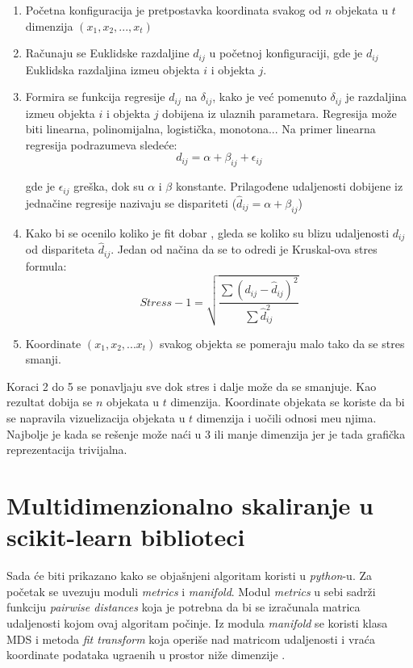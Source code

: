 \begin{enumerate}
    \item Po\v cetna konfiguracija je pretpostavka koordinata svakog od $n$ objekata u $t$ dimenzija $(x_{1}, x_{2}, ..., x_{t})$
    \item Ra\v cunaju se Euklidske razdaljine $d_{ij}$ u po\v cetnoj konfiguraciji, gde je $d_{ij}$ Euklidska razdaljina izme\dj u objekta $i$ i objekta $j$. 
    \item Formira se funkcija regresije $d_{ij}$ na $\delta_{ij}$, kako je ve\' c pomenuto $\delta_{ij}$ je razdaljina izme\dj u objekta $i$ i objekta $j$ dobijena iz ulaznih parametara. Regresija mo\v ze biti linearna, polinomijalna, logisti\v cka, monotona... Na primer linearna regresija podrazumeva slede\' ce:
    $$d_{ij} = \alpha + \beta_{ij} + \epsilon_{ij}$$

    gde je $\epsilon_{ij}$ gre\v ska, dok su $\alpha$ i $\beta$ konstante.
    Prilagođene udaljenosti dobijene iz jednačine regresije nazivaju se dispariteti ($\hat{d}_{ij} = \alpha + \beta_{ij}$)

    \item Kako bi se ocenilo koliko  je fit dobar , gleda se koliko su blizu udaljenosti $d_{ij}$ od dispariteta $\hat{d}_{ij}$. Jedan od na\v cina da se to odredi je Kruskal-ova stres formula: 
    $$Stress - 1 = \sqrt{\frac{\sum(d_{ij} - \hat{d}_{ij})^{2}}{\sum \hat{d}^{2}_{ij}}}$$
    \item Koordinate $(x_{1}, x_{2}, ... x_{t})$ svakog objekta se pomeraju malo tako da se stres smanji.
\end{enumerate}

    Koraci 2 do 5 se ponavljaju sve dok stres i dalje mo\v ze da se smanjuje. Kao rezultat dobija se $n$ objekata u $t$ dimenzija. Koordinate objekata se koriste da bi se napravila vizuelizacija objekata u $t$ dimenzija i uo\v cili odnosi me\dj u njima. Najbolje je kada se re\v senje mo\v ze na\' ci u 3 ili manje dimenzija jer je tada grafi\v cka reprezentacija trivijalna.

\section{Multidimenzionalno skaliranje u \textenglish{scikit-learn} biblioteci}
Sada \' ce biti prikazano  kako se obja\v snjeni algoritam koristi u {\it\textenglish{python}}-u. Za po\v cetak se  uvezuju moduli {\it\textenglish{metrics}} i {\it\textenglish{manifold}}. Modul {\it\textenglish{metrics}} u sebi sadr\v zi funkciju {\it\textenglish{pairwise distances}} koja  je potrebna da bi se izra\v cunala matrica udaljenosti kojom ovaj algoritam po\v cinje. Iz modula {\it\textenglish{manifold}} se koristi klasa \textenglish{MDS}  i metoda {\it\textenglish{fit transform}}  koja operi\v se nad matricom udaljenosti i vra\' ca koordinate podataka ugra\dj enih u prostor ni\v ze dimenzije \cite{SKLDOC}. 

